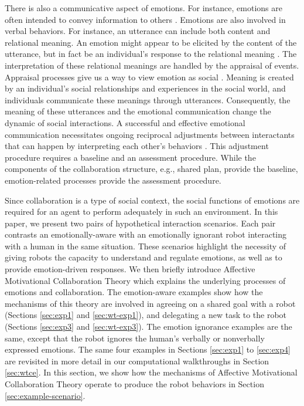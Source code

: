 There is also a communicative aspect of emotions. For instance, emotions are
often intended to convey information to others \cite{goffman:self-presentation}.
Emotions are also involved in verbal behaviors. For instance, an utterance can
include both content and relational meaning. An emotion might appear to be
elicited by the content of the utterance, but in fact be an individual's
response to the relational meaning \cite{planalp:communicating-emotion}. The
interpretation of these relational meanings are handled by the appraisal of
events. Appraisal processes give us a way to view emotion as social
\cite{hooft:sharing-emotions}. Meaning is created by an individual's social
relationships and experiences in the social world, and individuals communicate
these meanings through utterances. Consequently, the meaning of these utterances
and the emotional communication change the dynamic of social interactions. A
successful and effective emotional communication necessitates ongoing reciprocal
adjustments between interactants that can happen by interpreting each other's
behaviors \cite{parkinson:emotion-social-interaction}. This adjustment procedure
requires a baseline and an assessment procedure. While the components of the
collaboration structure, e.g., shared plan, provide the baseline,
emotion-related processes provide the assessment procedure.

Since collaboration is a type of social context, the social functions of
emotions are required for an agent to perform adequately in such an environment.
In this paper, we present two pairs of hypothetical interaction scenarios. Each
pair contrasts an emotionally-aware with an emotionally ignorant robot
interacting with a human in the same situation. These scenarios highlight the
necessity of giving robots the capacity to understand and regulate emotions, as
well as to provide emotion-driven responses. We then briefly introduce
Affective Motivational Collaboration Theory which explains the underlying
processes of emotions and collaboration. The emotion-aware examples show how the
mechanisms of this theory are involved in agreeing on a shared goal with a robot
(Sections \ref{sec:exp1} and \ref{sec:wt-exp1}), and delegating a new task to
the robot (Sections \ref{sec:exp3} and \ref{sec:wt-exp3}). The emotion ignorance
examples are the same, except that the robot ignores the human's verbally or
nonverbally expressed emotions. The same four examples in Sections
\ref{sec:exp1} to \ref{sec:exp4} are revisited in more detail in our
computational walkthroughs in Section \ref{sec:wtce}. In this section, we show
how the mechanisms of Affective Motivational Collaboration Theory operate to
produce the robot behaviors in Section \ref{sec:example-scenario}.

